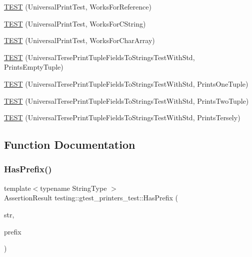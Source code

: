 \begin{DoxyCompactItemize}
\item 
\mbox{\hyperlink{namespacetesting_1_1gtest__printers__test_a58ad7c81884e852b09646764ce14a47e}{T\+E\+ST}} (Universal\+Print\+Test, Works\+For\+Reference)
\item 
\mbox{\hyperlink{namespacetesting_1_1gtest__printers__test_ac20aca012aca1ca9589dbf7483fbbbd1}{T\+E\+ST}} (Universal\+Print\+Test, Works\+For\+C\+String)
\item 
\mbox{\hyperlink{namespacetesting_1_1gtest__printers__test_a23a9eda97679bfc29c87b8de17cc35bf}{T\+E\+ST}} (Universal\+Print\+Test, Works\+For\+Char\+Array)
\item 
\mbox{\hyperlink{namespacetesting_1_1gtest__printers__test_a4e30c6dbea7bf0ebcfa9b0e0d79e0283}{T\+E\+ST}} (Universal\+Terse\+Print\+Tuple\+Fields\+To\+Strings\+Test\+With\+Std, Prints\+Empty\+Tuple)
\item 
\mbox{\hyperlink{namespacetesting_1_1gtest__printers__test_a09537ac3801c572e0ce9bade09fd9d79}{T\+E\+ST}} (Universal\+Terse\+Print\+Tuple\+Fields\+To\+Strings\+Test\+With\+Std, Prints\+One\+Tuple)
\item 
\mbox{\hyperlink{namespacetesting_1_1gtest__printers__test_a2ad138c4bcc4afb2deae1466ad3351f1}{T\+E\+ST}} (Universal\+Terse\+Print\+Tuple\+Fields\+To\+Strings\+Test\+With\+Std, Prints\+Two\+Tuple)
\item 
\mbox{\hyperlink{namespacetesting_1_1gtest__printers__test_a2121c7c548cc174639947ff8f810759a}{T\+E\+ST}} (Universal\+Terse\+Print\+Tuple\+Fields\+To\+Strings\+Test\+With\+Std, Prints\+Tersely)
\end{DoxyCompactItemize}


\subsection{Function Documentation}
\mbox{\label{namespacetesting_1_1gtest__printers__test_abbd436200da6c80944c8a7504fb56ea1}} 
\subsubsection{\texorpdfstring{HasPrefix()}{HasPrefix()}}
{\footnotesize\ttfamily template$<$typename String\+Type $>$ \\
Assertion\+Result testing\+::gtest\+\_\+printers\+\_\+test\+::\+Has\+Prefix (\begin{DoxyParamCaption}\item[{const String\+Type \&}]{str,  }\item[{const String\+Type \&}]{prefix }\end{DoxyParamCaption})}

